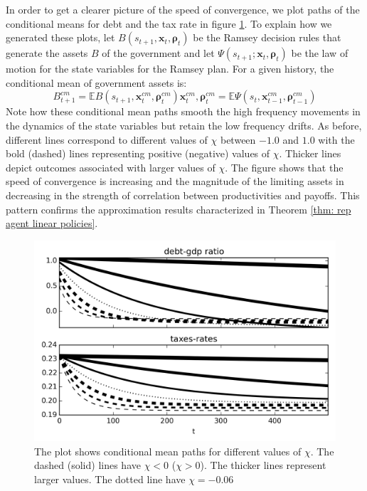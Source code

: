\documentclass[thmsb,11pt]{article}
\begin{document}
In order to get a clearer picture of the speed of convergence, we plot  paths of the conditional means for debt and the  tax rate in figure \ref{fig:speed_of_convergence}.
To explain how we generated these plots, let $B(s_{t+1},\bm x_t, \bm \rho_t)$ be the Ramsey decision rules
that generate the assets $B$ of the government and let $\Psi \left( s_{t+1};\bm{x}_t,\bm{\rho }_t\right)$ be the law of motion for the state variables for the Ramsey plan.
For a given history, the conditional mean of government assets is:
\begin{subequations}
\begin{equation}
B^{cm}_{t+1}=\mathbb{E}B(s_{t+1},\bm x^{cm}_t,\bm \rho^{cm}_{t})
\end{equation}
 \begin{equation}
 \bm x^{cm}_t,\bm \rho^{cm}_{t}=\mathbb{E}\Psi (s_{t}, \bm x^{cm}_{t-1},\bm \rho^{cm}_{t-1})
 \end{equation}
\end{subequations}
Note how these conditional mean  paths smooth the high frequency movements in the dynamics of the state variables but retain the low frequency drifts.
 As before,  different lines correspond to  different values of $\chi$ between $-1.0$ and $1.0$ with the bold (dashed) lines representing positive (negative) values of $\chi$.
 Thicker  lines depict outcomes associated with larger values of $\chi$. The figure  shows that the speed of convergence is increasing and the magnitude of the limiting assets in decreasing
 in the strength of correlation between productivities and payoffs. This pattern  confirms the approximation results characterized in Theorem \ref{thm: rep agent linear policies}.

 {
  \begin{figure}
    \centering
    \includegraphics[width = .9\textwidth]{cesplots/speed_of_convergence.png}
    \caption{The plot shows conditional mean paths for different values of $\chi$. The dashed (solid) lines have $\chi<0$ ($\chi>0$). The thicker lines represent larger values. The dotted line have $\chi=-0.06$}
      \label{fig:speed_of_convergence}
  \end{figure}

}
\end{document}
